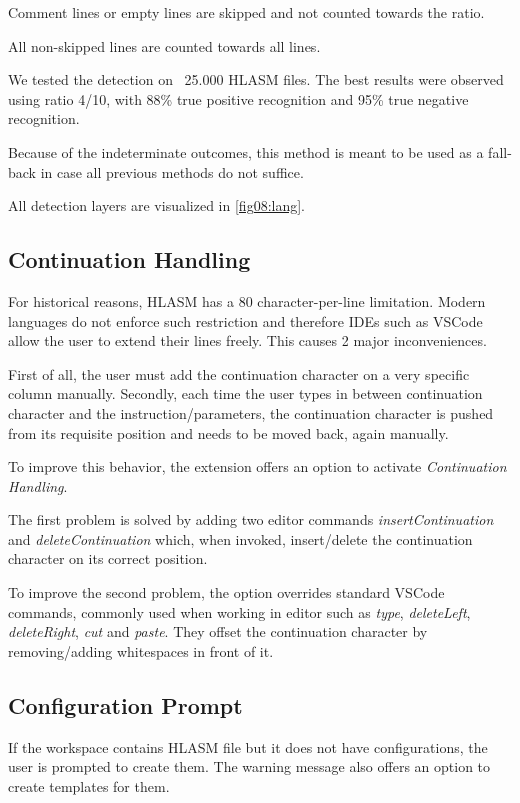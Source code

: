 Comment lines or empty lines are skipped and not counted towards the ratio. 

All non-skipped lines are counted towards all lines.

We tested the detection on ~25.000 HLASM files. The best results were observed using ratio 4/10, with 88\% true positive recognition and 95\% true negative recognition. 

Because of the indeterminate outcomes, this method is meant to be used as a fall-back in case all previous methods do not suffice.

All detection layers are visualized in \cref{fig08:lang}.

\subsection{Continuation Handling}

For historical reasons, HLASM has a 80 character-per-line limitation. Modern languages do not enforce such restriction and therefore IDEs such as VSCode allow the user to extend their lines freely. This causes 2 major inconveniences.

First of all, the user must add the continuation character on a very specific column manually. Secondly, each time the user types in between continuation character and the instruction/parameters, the continuation character is pushed from its requisite position and needs to be moved back, again manually.

To improve this behavior, the extension offers an option to activate \emph{Continuation Handling}. 

The first problem is solved by adding two editor commands \emph{insertContinuation} and \emph{deleteContinuation} which, when invoked, insert/delete the continuation character on its correct position.

To improve the second problem, the option overrides standard VSCode commands, commonly used when working in editor such as \emph{type}, \emph{deleteLeft}, \emph{deleteRight}, \emph{cut} and \emph{paste}. They offset the continuation character by removing/adding whitespaces in front of it.


\subsection{Configuration Prompt}

If the workspace contains HLASM file but it does not have configurations, the user is prompted to create them. The warning message also offers an option to create templates for them.

